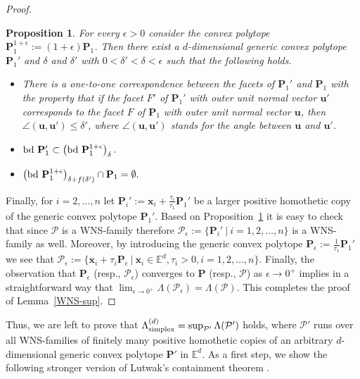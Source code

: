 \documentclass[12pt]{article}
\newtheorem{prop}{Proposition}
\newcommand{\xx}{\mathbf{x}}
\newcommand{\Ee}{{\mathbb E}}
\begin{document}
\begin{proof}
\begin{prop}\label{approximation}
For every $\epsilon>0$ consider the convex polytope $\mathbf{P}_1^{1+\epsilon}:=(1+\epsilon)\mathbf{P}_1$. Then there exist a $d$-dimensional generic convex polytope $\mathbf{P}_1'$ and $\delta$ and $\delta'$ with $0<\delta'<\delta<\epsilon$ such that the following holds.
\begin{itemize}
\item[(a)]
There is a one-to-one correspondence between the facets of $\mathbf{P}_1'$ and $\mathbf{P}_1$ with the property that if the facet $F'$ of $\mathbf{P}_1'$ with outer unit normal vector $\mathbf{u}'$ corresponds to the facet $F$ of $\mathbf{P}_1$ with outer unit normal vector $\mathbf{u}$, then $\angle (\mathbf{u}, \mathbf{u}')\leq\delta'$, where $\angle (\mathbf{u}, \mathbf{u}')$ stands for the angle between $\mathbf{u}$ and $\mathbf{u}'$.
\item[(b)]
${\rm bd}\ \mathbf{P}_1'\subset\left({\rm bd}\ \mathbf{P}_1^{1+\epsilon}\right)_{\delta}.$
\item[(c)] $\left({\rm bd}\ \mathbf{P}_1^{1+\epsilon}\right)_{\delta+f(\delta')}\cap\mathbf{P}_1=\emptyset.$
\end{itemize} 
\end{prop}

Finally, for $i=2,\dots , n$ let $\mathbf{P}_i':=\xx_i+\frac{\tau_i}{\tau_1}\mathbf{P}_1'$ be a larger positive homothetic copy of the generic convex polytope $\mathbf{P}_1'$. Based on Proposition~\ref{approximation} it is easy to check that since $\mathcal{P}$ is a WNS-family therefore $\mathcal{P}_{\epsilon}:=\{ \mathbf{P}_i'\ |\  i=1,2,\ldots, n\}$ is a WNS-family as well. Moreover, by introducing the generic convex polytope $\mathbf{P}_{\epsilon}:=\frac{1}{\tau_1}\mathbf{P}_1'$ we see that $\mathcal{P}_{\epsilon}:=\{ \xx_i + \tau_i \mathbf{P}_{\epsilon}\ |\  \xx_i\in \Ee^d, \tau_i>0, i=1,2,\ldots, n\}$. Finally, the observation that $\mathbf{P}_{\epsilon}$ (resp., $\mathcal{P}_{\epsilon}$) converges to $\mathbf{P}$ (resp., $\mathcal{P}$) as $\epsilon\to 0^+$ implies in a straightforward way that $\lim_{\epsilon\to 0^+}\Lambda(\mathcal{P}_{\epsilon})=\Lambda(\mathcal{P})$. This completes the proof of Lemma~\ref{WNS-sup}. \end{proof}

Thus, we are left to prove that  $\Lambda_{\rm simplex}^{(d)}=\sup_{\mathcal{P}'} \Lambda(\mathcal{P}')$ holds, where $\mathcal{P}'$ runs over all WNS-families of finitely many positive homothetic copies of an arbitrary $d$-dimensional generic convex polytope $\mathbf{P}'$ in $\Ee^d$. As a first step, we show the following stronger version of Lutwak's containment theorem \cite{Lut}.
\end{document}
